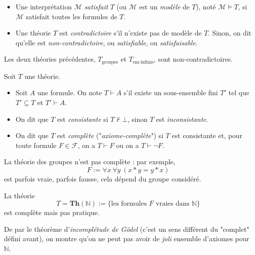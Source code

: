 \documentclass[./main]{subfiles}
\begin{document}
  \begin{defn}[Sémantique]
    \begin{itemize}
      \item Une interprétation $\mathcal{M}$ \textit{satisfait} $T$ (ou $\mathcal{M}$ est un \textit{modèle} de $T$), noté $\mathcal{M} \models T$, si $\mathcal{M}$ satisfait toutes les formules de $T$.
      \item Une théorie $T$ est \textit{contradictoire} s'il n'existe pas de modèle de $T$. Sinon, on dit qu'elle est \textit{non-contradictoire}, ou \textit{satisfiable}, ou \textit{satisfaisable}.
    \end{itemize}
  \end{defn}

  \begin{exm}
    Les deux théories précédentes, $T_\mathrm{groupes}$ et $T_\mathrm{ens\ infinis}$, sont non-contradictoires.
  \end{exm}

  \begin{defn}[Syntaxique]
    Soit $T$ une théorie.
    \begin{itemize}
      \item Soit $A$ une formule. On note $T \vdash A$ s'il existe un sous-ensemble fini $T'$ tel que $T' \subseteq T$ et $T' \vdash A$.
      \item On dit que $T$ est \textit{consistante} si $T \nvdash \bot$, sinon $T$ est \textit{inconsistante}.
      \item On dit que $T$ est \textit{complète} ("\textit{axiome-complète}") si $T$ est consistante et, pour toute formule $F \in \mathcal{F}$, on a $T \vdash F$ ou on a $T \vdash \lnot F$.
    \end{itemize}
  \end{defn}

  \begin{exm}
    La théorie des groupes n'est pas complète : par exemple, \[
    F := \forall x \: \forall y \: (x * y = y * x)
    \] est parfois vraie, parfois fausse, cela dépend du groupe considéré.
  \end{exm}

  \begin{exm}
    La théorie \[
      T = \mathbf{Th}(\mathds{N}) := \{\text{les formules $F$ vraies dans $\mathds{N}$}\}
    \] est complète mais pas pratique.

    De par le théorème d'\textit{incomplétude de Gödel} (c'est un sens différent du "complet" défini avant), on montre qu'on ne peut pas avoir de \textit{joli} ensemble d'axiomes pour $\mathds{N}$.
  \end{exm}
\end{document}
